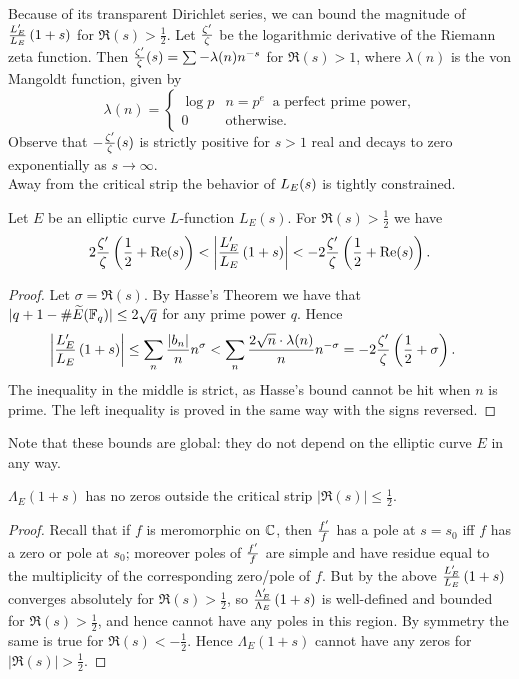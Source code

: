 Because of its transparent Dirichlet series, we can bound the magnitude of $\frac{L_E^{\prime}}{L_E}\left(1+s\right)$ for $\Re(s)>\frac{1}{2}$. Let $\frac{\zeta^{\prime}}{\zeta}$ be the logarithmic derivative of the Riemann zeta function. Then $\frac{\zeta^{\prime}}{\zeta}(s) = \sum -\lambda(n) n^{-s}$ for $\Re(s)>1$, where $\lambda(n)$ is the von Mangoldt function, given by
\begin{equation}\label{eqn:vonmangoldt}
\lambda(n) = \begin{cases} \log p & n = p^e \;\;\text{a perfect prime power,} \\ 0 & \text{otherwise.} \end{cases}
\end{equation}
Observe that $-\frac{\zeta^{\prime}}{\zeta}(s)$ is strictly positive for $s > 1$ real and decays to zero exponentially as $s \to \infty$. \\

Away from the critical strip the behavior of $L_E(s)$ is tightly constrained.
\begin{lemma}\label{lem:ldLe_bound}
Let $E$ be an elliptic curve $L$-function $L_E(s)$. For $\Re(s)>\frac{1}{2}$ we have\begin{equation}
2\frac{\zeta^{\prime}}{\zeta}\left(\frac{1}{2}+\mbox{\rm Re}(s)\right) < \left| \frac{L_E^{\prime}}{L_E}\left(1+s\right)\right| < -2\frac{\zeta^{\prime}}{\zeta}\left(\frac{1}{2}+\mbox{\rm Re}(s)\right).
\end{equation}
\end{lemma}

\begin{proof}
Let $\sigma = \Re(s)$. By Hasse's Theorem we have that $|q + 1 - \#\widetilde{E}(\mathbb{F}_{q})| \le 2\sqrt{q}$ for any prime power $q$. Hence
\begin{align*}
\left| \frac{L_E^{\prime}}{L_E}\left(1+s\right)\right| &\le \sum_n \frac{|b_n|}{n} n^\sigma < \sum_{n} \frac{2\sqrt{n} \cdot \lambda(n)}{n} n^{-\sigma}  = -2\frac{\zeta^{\prime}}{\zeta}\left(\frac{1}{2}+\sigma\right).
\end{align*}
The inequality in the middle is strict, as Hasse's bound cannot be hit when $n$ is prime. The left inequality is proved in the same way with the signs reversed.
\end{proof}
Note that these bounds are global: they do not depend on the elliptic curve $E$ in any way.

\begin{corollary}
$\Lambda_E(1+s)$ has no zeros outside the critical strip $|\Re(s)| \le \frac{1}{2}$.
\end{corollary}
\begin{proof}
Recall that if $f$ is meromorphic on $\mathbb{C}$, then $\frac{f^{\prime}}{f}$ has a pole at $s=s_0$ iff $f$ has a zero or pole at $s_0$; moreover poles of $\frac{f^{\prime}}{f}$ are simple and have residue equal to the multiplicity of the corresponding zero/pole of $f$. But by the above $\frac{L_E^{\prime}}{L_E}\left(1+s\right)$ converges absolutely for $\Re(s)>\frac{1}{2}$, so $\frac{\Lambda_E^{\prime}}{\Lambda_E}\left(1+s\right)$ is well-defined and bounded for $\Re(s)>\frac{1}{2}$, and hence cannot have any poles in this region. By symmetry the same is true for $\Re(s)<-\frac{1}{2}$. Hence $\Lambda_E(1+s)$ cannot have any zeros for $|\Re(s)| > \frac{1}{2}$.
\end{proof}


